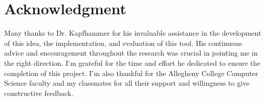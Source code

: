 \chapter*{Acknowledgment}

Many thanks to Dr. Kapfhammer for his invaluable assistance in the development of this
idea, the implementation, and evaluation of this tool. His continuous advice
and encouragement throughout the research was crucial in pointing me in the
right direction. I'm grateful for the time and effort he dedicated to ensure the
completion of this project. I'm also thankful for the Allegheny College
Computer Science faculty and my classmates for all their support and willingness
to give constructive feedback.
